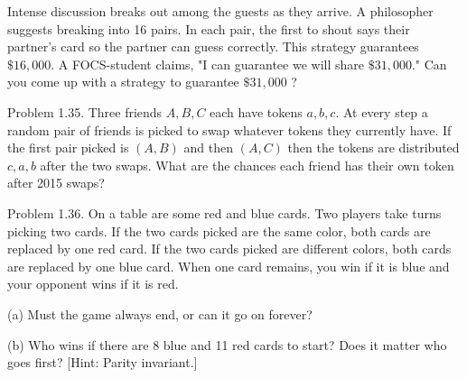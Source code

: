 \documentclass[10pt]{article}
\begin{document}
Intense discussion breaks out among the guests as they arrive. A philosopher suggests breaking into 16 pairs. In each pair, the first to shout says their partner's card so the partner can guess correctly. This strategy guarantees $\$ 16,000$. A FOCS-student claims, "I can guarantee we will share $\$ 31,000$." Can you come up with a strategy to guarantee $\$ 31,000$ ?

Problem 1.35. Three friends $A, B, C$ each have tokens $a, b, c$. At every step a random pair of friends is picked to swap whatever tokens they currently have. If the first pair picked is $(A, B)$ and then $(A, C)$ then the tokens are distributed $c, a, b$ after the two swaps. What are the chances each friend has their own token after 2015 swaps?

Problem 1.36. On a table are some red and blue cards. Two players take turns picking two cards. If the two cards picked are the same color, both cards are replaced by one red card. If the two cards picked are different colors, both cards are replaced by one blue card. When one card remains, you win if it is blue and your opponent wins if it is red.

(a) Must the game always end, or can it go on forever?

(b) Who wins if there are 8 blue and 11 red cards to start? Does it matter who goes first? [Hint: Parity invariant.]
\end{document}
